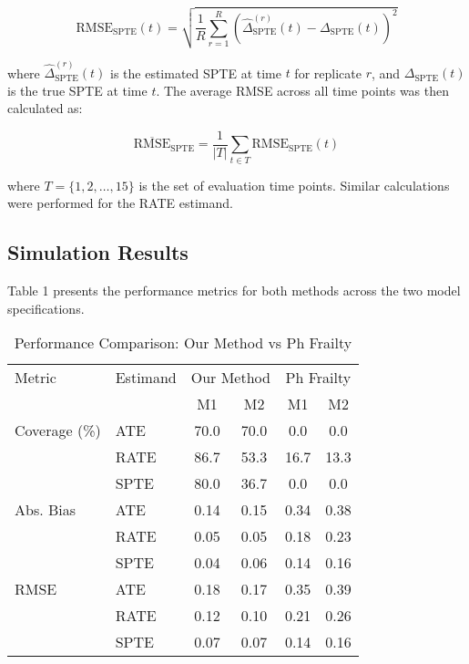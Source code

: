 \documentclass[useAMS,referee]{biom}
\begin{document}
\begin{equation}
\text{RMSE}_{\text{SPTE}}(t) = \sqrt{\frac{1}{R}\sum_{r=1}^{R}(\hat{\Delta}_{\text{SPTE}}^{(r)}(t) - \Delta_{\text{SPTE}}(t))^2}
\end{equation}

where $\hat{\Delta}_{\text{SPTE}}^{(r)}(t)$ is the estimated SPTE at time $t$ for replicate $r$, and $\Delta_{\text{SPTE}}(t)$ is the true SPTE at time $t$. The average RMSE across all time points was then calculated as:

\begin{equation}
\overline{\text{RMSE}}_{\text{SPTE}} = \frac{1}{|T|}\sum_{t \in T}\text{RMSE}_{\text{SPTE}}(t)
\end{equation}

where $T = \{1, 2, \ldots, 15\}$ is the set of evaluation time points. Similar calculations were performed for the RATE estimand.

\subsection{Simulation Results}

Table 1 presents the performance metrics for both methods across the two model specifications.

\begin{table}[ht]
    \centering
    \caption{Performance Comparison: Our Method vs Ph Frailty}
    \label{tab:sim_results}
    \begin{tabular}{|l|l|cc|cc|}
    \hline
    Metric & Estimand & \multicolumn{2}{c|}{Our Method} & \multicolumn{2}{c|}{Ph Frailty} \\
    \cline{3-6}
    & & M1 & M2 & M1 & M2 \\
    \hline
    Coverage (\%) 
    & ATE  & 70.0 & 70.0 & 0.0 & 0.0 \\
    & RATE & 86.7 & 53.3 & 16.7 & 13.3 \\
    & SPTE & 80.0 & 36.7 & 0.0 & 0.0 \\
    \hline
    Abs. Bias 
    & ATE  & 0.14 & 0.15 & 0.34 & 0.38 \\
    & RATE & 0.05 & 0.05 & 0.18 & 0.23 \\
    & SPTE & 0.04 & 0.06 & 0.14 & 0.16 \\
    \hline
    RMSE 
    & ATE  & 0.18 & 0.17 & 0.35 & 0.39 \\
    & RATE & 0.12 & 0.10 & 0.21 & 0.26 \\
    & SPTE & 0.07 & 0.07 & 0.14 & 0.16 \\
    \hline
    \end{tabular}
\end{table}
\end{document}
